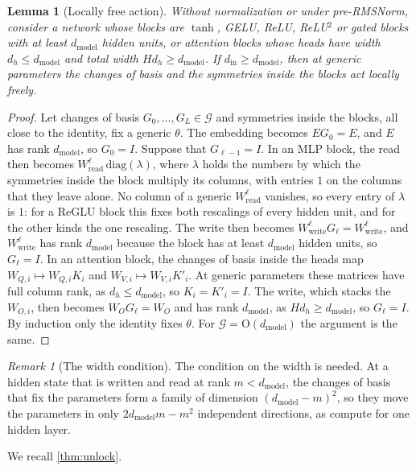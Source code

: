 \documentclass[10pt]{article}
\newtheorem{lemma}[theorem]{Lemma}
\theoremstyle{definition}
\theoremstyle{remark}
\newtheorem{remark}[theorem]{Remark}
\newcommand{\Wread}{W_{\mathrm{read}}}
\newcommand{\Wwrite}{W_{\mathrm{write}}}
\newcommand{\dm}{d_{\mathrm{model}}}
\newcommand{\Ort}{\mathrm{O}}
\newcommand{\G}{\mathcal{G}}
\begin{document}
\begin{lemma}[Locally free action]\label{lem:free}
Without normalization or under pre-RMSNorm, consider a network whose blocks are $\tanh$, GELU, ReLU, ReLU$^2$ or gated blocks with at least $\dm$ hidden units, or attention blocks whose heads have width $d_h \le \dm$ and total width $Hd_h \ge \dm$. If $d_{\mathrm{in}} \ge \dm$, then at generic parameters the changes of basis and the symmetries inside the blocks act locally freely.
\end{lemma}

\begin{proof}
Let changes of basis $G_0, \dots, G_L \in \G$ and symmetries inside the blocks, all close to the identity, fix a generic $\theta$. The embedding becomes $EG_0 = E$, and $E$ has rank $\dm$, so $G_0 = I$. Suppose that $G_{\ell-1} = I$. In an MLP block, the read then becomes $\Wread^{\ell}\,\mathrm{diag}(\lambda)$, where $\lambda$ holds the numbers by which the symmetries inside the block multiply its columns, with entries $1$ on the columns that they leave alone. No column of a generic $\Wread^{\ell}$ vanishes, so every entry of $\lambda$ is $1$: for a ReGLU block this fixes both rescalings of every hidden unit, and for the other kinds the one rescaling. The write then becomes $\Wwrite^{\ell}G_\ell = \Wwrite^{\ell}$, and $\Wwrite^{\ell}$ has rank $\dm$ because the block has at least $\dm$ hidden units, so $G_\ell = I$. In an attention block, the changes of basis inside the heads map $W_{Q,i} \mapsto W_{Q,i}K_i$ and $W_{V,i} \mapsto W_{V,i}K'_i$. At generic parameters these matrices have full column rank, as $d_h \le \dm$, so $K_i = K'_i = I$. The write, which stacks the $W_{O,i}$, then becomes $W_OG_\ell = W_O$ and has rank $\dm$, as $Hd_h \ge \dm$, so $G_\ell = I$. By induction only the identity fixes $\theta$. For $\G = \Ort(\dm)$ the argument is the same.
\end{proof}

\begin{remark}[The width condition]\label{rem:attnfree}
The condition on the width is needed. At a hidden state that is written and read at rank $m < \dm$, the changes of basis that fix the parameters form a family of dimension $(\dm-m)^2$, so they move the parameters in only $2\dm m - m^2$ independent directions, as \citet[Proposition~C.3]{zhao2023symmetries} compute for one hidden layer.
\end{remark}

We recall \cref{thm:unlock}.
\thmUnlock*
\end{document}
